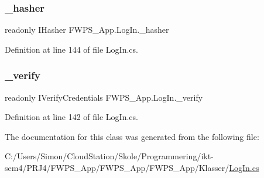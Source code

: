 \subsubsection{\texorpdfstring{\+\_\+hasher}{\_hasher}}
{\footnotesize\ttfamily readonly I\+Hasher F\+W\+P\+S\+\_\+\+App.\+Log\+In.\+\_\+hasher\hspace{0.3cm}{\ttfamily [private]}}



Definition at line 144 of file Log\+In.\+cs.

\mbox{\label{class_f_w_p_s___app_1_1_log_in_af0912320a76a9ea8aae6140aa35a928d}} 
\subsubsection{\texorpdfstring{\+\_\+verify}{\_verify}}
{\footnotesize\ttfamily readonly I\+Verify\+Credentials F\+W\+P\+S\+\_\+\+App.\+Log\+In.\+\_\+verify\hspace{0.3cm}{\ttfamily [private]}}



Definition at line 142 of file Log\+In.\+cs.



The documentation for this class was generated from the following file\+:\begin{DoxyCompactItemize}
\item 
C\+:/\+Users/\+Simon/\+Cloud\+Station/\+Skole/\+Programmering/ikt-\/sem4/\+P\+R\+J4/\+F\+W\+P\+S\+\_\+\+App/\+F\+W\+P\+S\+\_\+\+App/\+F\+W\+P\+S\+\_\+\+App/\+Klasser/\mbox{\hyperlink{_log_in_8cs}{Log\+In.\+cs}}\end{DoxyCompactItemize}
